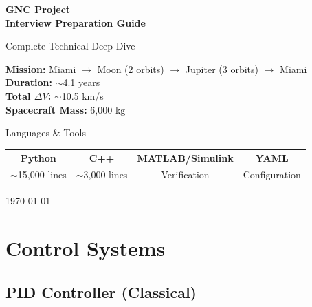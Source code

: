 \documentclass[11pt,a4paper]{article}
\begin{document}
\begin{titlepage}
    \centering
    \vspace*{2cm}

    {\Huge\bfseries\color{darkblue} GNC Project\\[0.3cm]
    Interview Preparation Guide}

    \vspace{1cm}

    {\Large\color{primaryblue} Complete Technical Deep-Dive}

    \vspace{2cm}

    \begin{tcolorbox}[colback=blue!5,colframe=primaryblue,width=0.8\textwidth]
        \centering
        \large
        \textbf{Mission:} Miami $\rightarrow$ Moon (2 orbits) $\rightarrow$ Jupiter (3 orbits) $\rightarrow$ Miami\\[0.5em]
        \textbf{Duration:} $\sim$4.1 years\\[0.5em]
        \textbf{Total $\Delta V$:} $\sim$10.5 km/s\\[0.5em]
        \textbf{Spacecraft Mass:} 6,000 kg
    \end{tcolorbox}

    \vspace{2cm}

    {\large Languages \& Tools}\\[0.5em]
    \begin{tabular}{cccc}
        \textbf{Python} & \textbf{C++} & \textbf{MATLAB/Simulink} & \textbf{YAML}\\
        $\sim$15,000 lines & $\sim$3,000 lines & Verification & Configuration
    \end{tabular}

    \vfill

    {\color{gray}\today}
\end{titlepage}

\tableofcontents
\newpage

\section{Control Systems}

\subsection{PID Controller (Classical)}
\end{document}
